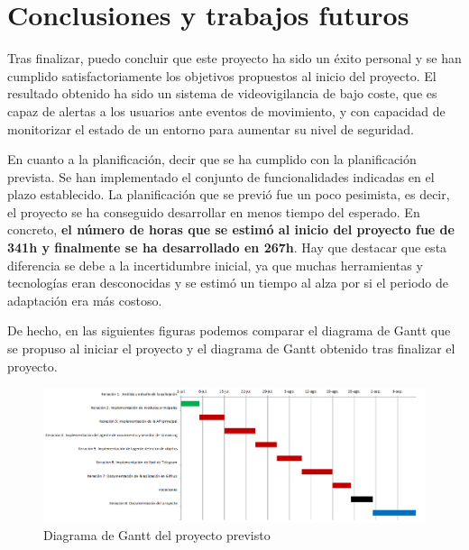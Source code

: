 


\pagestyle{miEstilo7}

\section{Conclusiones y trabajos futuros}\label{sec:conclusiones}

Tras finalizar, puedo concluir que este proyecto ha sido un éxito personal y se han cumplido satisfactoriamente los objetivos propuestos al inicio del proyecto. El resultado obtenido ha sido un sistema de videovigilancia de bajo coste, que es capaz de alertas a los usuarios ante eventos de movimiento, y con capacidad de monitorizar el estado de un entorno para aumentar su nivel de seguridad.

En cuanto a la planificación, decir que se ha cumplido con la planificación prevista. Se han implementado el conjunto de funcionalidades indicadas en el plazo establecido. La planificación que se previó fue un poco pesimista, es decir, el proyecto se ha conseguido desarrollar en menos tiempo del esperado. En concreto, \textbf{el número de horas que se estimó al inicio del proyecto fue de 341h y finalmente se ha desarrollado en 267h}. Hay que destacar que esta diferencia se debe a la incertidumbre inicial, ya que muchas herramientas y tecnologías eran desconocidas y se estimó un tiempo al alza por si el periodo de adaptación era más costoso.

De hecho, en las siguientes figuras podemos comparar el diagrama de Gantt que se propuso al iniciar el proyecto y el diagrama de Gantt obtenido tras finalizar el proyecto.

\begin{figure}[h]
	\centering
	\includegraphics[scale=0.45]{images/diagrama_gantt}
	\caption{Diagrama de Gantt del proyecto previsto}
\end{figure}

